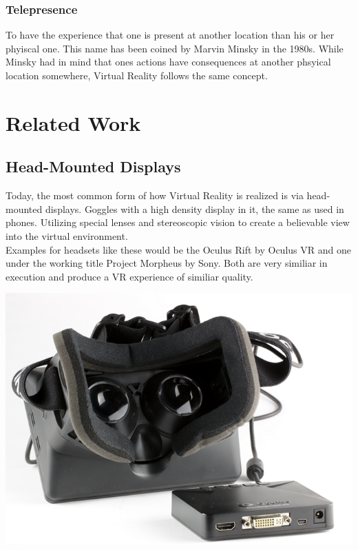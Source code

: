 \documentclass[11pt]{report}
\begin{document}
		\subsection{Telepresence}
			To have the experience that one is present at another location than his or her phyiscal one.  This name has been coined by Marvin Minsky in the 1980s. \cite{minsky1980telepresence} While Minsky had in mind that ones actions have consequences at another phsyical location somewhere, Virtual Reality follows the same concept.
			
\chapter{Related Work}
	\section{Head-Mounted Displays}
		Today, the most common form of how Virtual Reality is realized is via head-mounted displays. Goggles with a high density display in it, the same as used in phones. Utilizing special lenses and stereoscopic vision to create a believable view into the virtual environment. \\
		Examples for headsets like these would be the Oculus Rift by Oculus VR and one under the working title Project Morpheus by Sony. Both are very similiar in execution and produce a VR experience of similiar quality. \cite{goradia2014review}
		
	\includegraphics[scale=0.3]{or_small.png}
\end{document}
